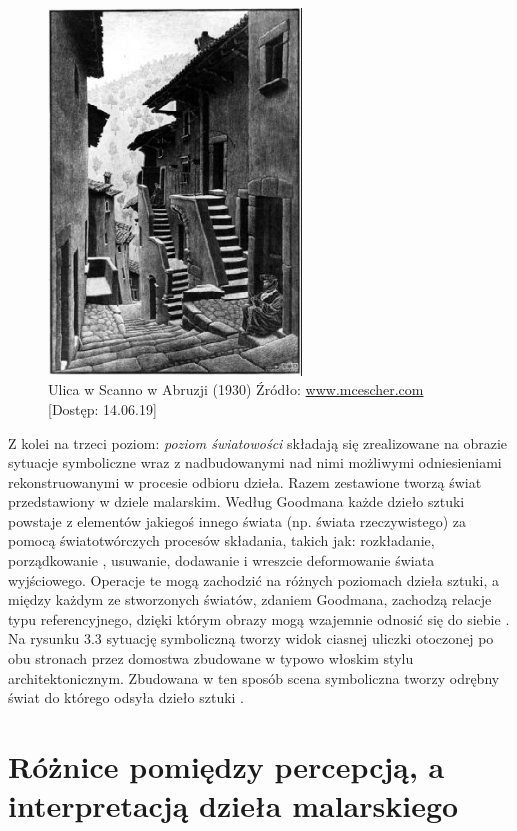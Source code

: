 \documentclass[licencjacka]{kdypl}
\begin{document}
    
\begin{figure}[H]
\includegraphics[width=0.6\textwidth]{street.jpg}
\centering
\caption{Ulica w Scanno w Abruzji (1930) Źródło: \url{www.mcescher.com} [Dostęp: 14.06.19]}
\end{figure}

Z kolei na trzeci poziom: \textit{poziom światowości} składają się zrealizowane na obrazie sytuacje symboliczne wraz z nadbudowanymi nad nimi możliwymi odniesieniami rekonstruowanymi w procesie odbioru dzieła. Razem zestawione tworzą świat przedstawiony w dziele malarskim. Według Goodmana każde dzieło sztuki powstaje z elementów jakiegoś innego świata (np. świata rzeczywistego) za pomocą światotwórczych procesów składania, takich jak: rozkładanie, porządkowanie , usuwanie, dodawanie i wreszcie deformowanie świata wyjściowego. Operacje te mogą zachodzić na różnych poziomach dzieła sztuki, a między każdym ze stworzonych światów, zdaniem Goodmana, zachodzą relacje typu referencyjnego, dzięki którym obrazy mogą wzajemnie odnosić się do siebie \citep[s. 394- 395]{Florek2006}. Na rysunku 3.3 sytuację symboliczną tworzy widok ciasnej uliczki otoczonej po obu stronach przez domostwa zbudowane w typowo włoskim stylu architektonicznym. Zbudowana w ten sposób scena symboliczna tworzy odrębny świat do którego odsyła dzieło sztuki \citep[s. 395]{Florek2006}.

 \section{Różnice pomiędzy percepcją, a interpretacją dzieła malarskiego}
 
\end{document}
